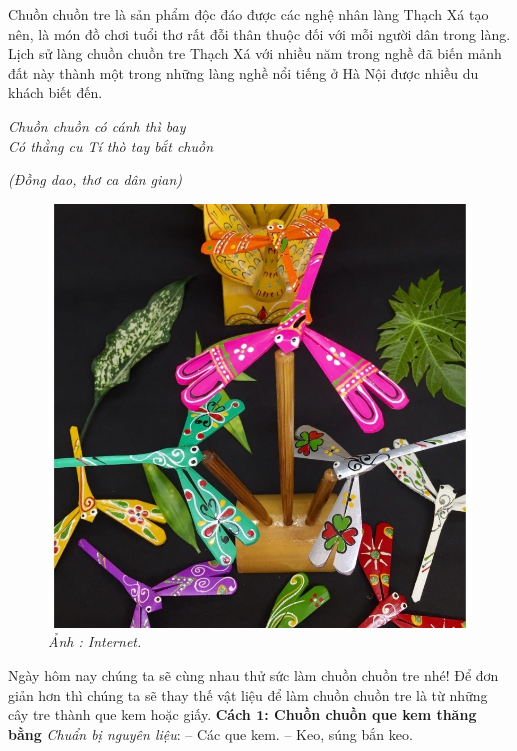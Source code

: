 \begin{multicols}{2}
	
	Chuồn chuồn tre là sản phẩm độc đáo được các nghệ nhân làng Thạch Xá tạo nên, là món đồ chơi tuổi thơ rất đỗi thân thuộc đối với mỗi người dân trong làng. Lịch sử làng chuồn chuồn tre Thạch Xá với nhiều năm trong nghề đã biến mảnh đất này thành một trong những làng nghề nổi tiếng ở Hà Nội được nhiều du khách biết đến.
	\vskip 0.1cm 
	\begin{center}
		\textit{Chuồn chuồn có cánh thì bay\\
	Có thằng cu Tí thò tay bắt chuồn}
	\end{center}
	\hfill \textit{(Đồng dao, thơ ca dân gian)}
	\begin{figure}[H]
		\vspace*{-5pt}
		\centering
		\captionsetup{labelformat= empty, justification=centering}
		\includegraphics[width= 0.9\linewidth]{10}
		\caption{\small\textit{\color{toancuabi}Ảnh : Internet.}}
		\vspace*{-10pt}
	\end{figure}
	Ngày hôm nay chúng ta sẽ cùng nhau thử sức làm chuồn chuồn tre nhé! Để đơn giản hơn thì chúng ta sẽ thay thế vật liệu để làm chuồn chuồn tre là từ những cây tre thành que kem hoặc giấy.
	\vskip 0.1cm
	\textbf{\color{toancuabi}Cách $\pmb{1}$: Chuồn chuồn que kem thăng bằng}
	\vskip 0.1cm
	\textit{Chuẩn bị nguyên liệu}: 
	\vskip 0.05cm
	-- Các que kem.
	\vskip 0.05cm
	-- Keo, súng bắn keo.

\end{multicols}
